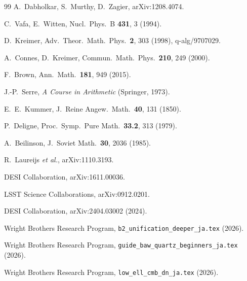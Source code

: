 \documentclass[11pt,a4paper]{article}
\begin{document}
\begin{thebibliography}{99}
A.~Dabholkar, S.~Murthy, D.~Zagier, arXiv:1208.4074.

C.~Vafa, E.~Witten, Nucl.\ Phys.\ B \textbf{431}, 3 (1994).

D.~Kreimer, Adv.\ Theor.\ Math.\ Phys.\ \textbf{2}, 303 (1998),
q-alg/9707029.

A.~Connes, D.~Kreimer, Commun.\ Math.\ Phys.\ \textbf{210}, 249 (2000).

F.~Brown, Ann.\ Math.\ \textbf{181}, 949 (2015).

J.-P.~Serre, \textit{A Course in Arithmetic} (Springer, 1973).

E.~E.~Kummer, J.\ Reine Angew.\ Math.\ \textbf{40}, 131 (1850).

P.~Deligne, Proc.\ Symp.\ Pure Math.\ \textbf{33.2}, 313 (1979).

A.~Beilinson, J.\ Soviet Math.\ \textbf{30}, 2036 (1985).

R.~Laureijs \textit{et al.}, arXiv:1110.3193.

DESI Collaboration, arXiv:1611.00036.

LSST Science Collaborations, arXiv:0912.0201.

DESI Collaboration, arXiv:2404.03002 (2024).

Wright Brothers Research Program, \texttt{b2\_unification\_deeper\_ja.tex} (2026).

Wright Brothers Research Program, \texttt{guide\_baw\_quartz\_beginners\_ja.tex} (2026).

Wright Brothers Research Program, \texttt{low\_ell\_cmb\_dn\_ja.tex} (2026).

\end{thebibliography}
\end{document}
